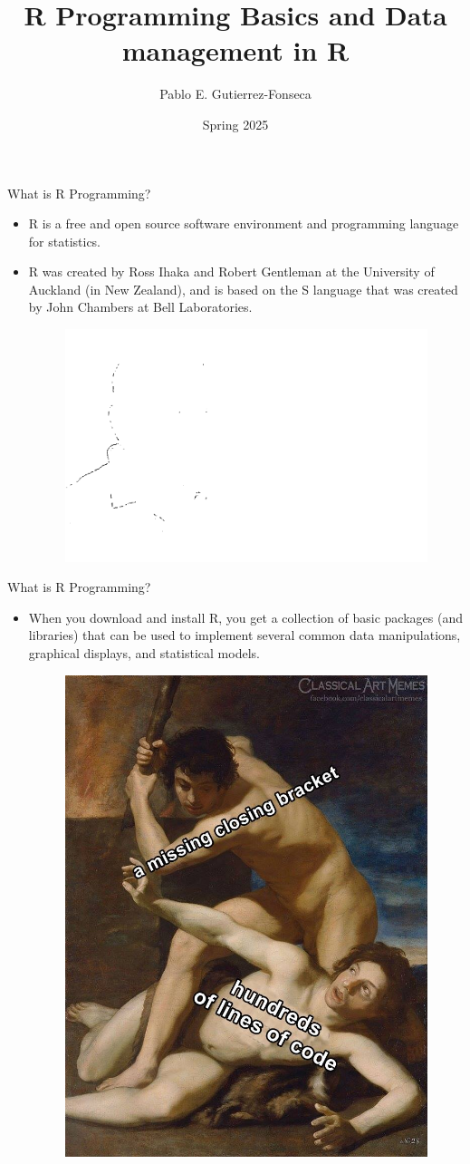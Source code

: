 \documentclass[
  ignorenonframetext,
]{beamer}
\title{R Programming Basics and Data management in R}
\author{Pablo E. Gutierrez-Fonseca}
\date{Spring 2025}
\providecommand{\tightlist}{%
  \setlength{\itemsep}{0pt}\setlength{\parskip}{0pt}}
\begin{document}
\frame{\titlepage}

\begin{frame}{What is R Programming?}
\label{what-is-r-programming}
\begin{itemize}
\tightlist
\item
  R is a free and open source software environment and programming
  language for statistics.
\end{itemize}

\begin{itemize}
\tightlist
\item
  R was created by Ross Ihaka and Robert Gentleman at the University of
  Auckland (in New Zealand), and is based on the S language that was
  created by John Chambers at Bell Laboratories.

  \begin{figure}
  \includegraphics[width=0.5\linewidth]{fig/criadores_r} \end{figure}
\end{itemize}
\end{frame}

\begin{frame}{What is R Programming?}
\label{what-is-r-programming-1}
\begin{itemize}
\tightlist
\item
  When you download and install R, you get a collection of basic
  packages (and libraries) that can be used to implement several common
  data manipulations, graphical displays, and statistical models.

  \begin{figure}
  \includegraphics[width=0.3\linewidth]{fig/meme} \end{figure}
\end{itemize}
\end{frame}
\end{document}
